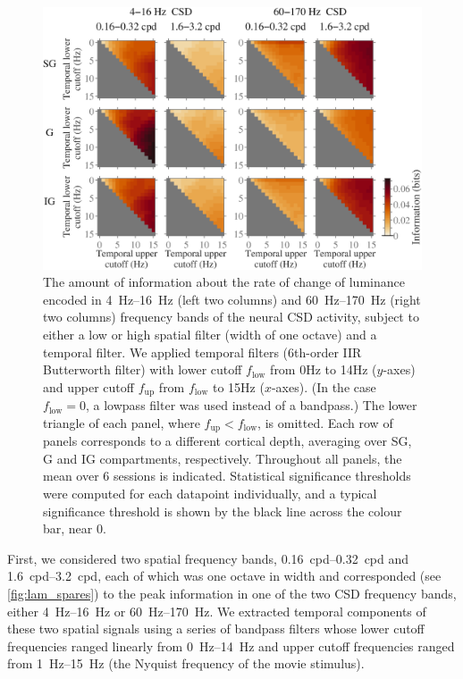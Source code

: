 \begin{figure}[htbp]
\centerline{
\includegraphics[scale=.4]{figs/tmf/tmf-v-tmf-sggig-avg-tmfres1b-2Band-2Crs.eps}
}
%
\caption{
The amount of information about the rate of change of luminance encoded in \SIrange{4}{16}{Hz} (left two columns) and \SIrange{60}{170}{Hz} (right two columns) frequency bands of the neural \ac{CSD} activity, subject to either a low or high spatial filter (width of one octave) and a temporal filter.
We applied temporal filters (6th-order \ac{IIR} Butterworth filter) with lower cutoff $f_\text{low}$ from \num{0}{Hz} to \num{14}{Hz} ($y$-axes) and upper cutoff $f_\text{up}$ from $f_\text{low}$ to \num{15}{Hz} ($x$-axes).
(In the case $f_\text{low} = 0$, a lowpass filter was used instead of a bandpass.)
The lower triangle of each panel, where $f_\text{up} < f_\text{low}$, is omitted.
Each row of panels corresponds to a different cortical depth, averaging over \ac{SG}, \ac{G} and \ac{IG} compartments, respectively.
Throughout all panels, the mean over \num{6} sessions is indicated.
Statistical significance thresholds were computed for each datapoint individually, and a typical significance threshold is shown by the black line across the colour bar, near $0$.
}
\label{fig:lam_tmf}
%
\end{figure}

First, we considered two spatial frequency bands, \SIrange{0.16}{0.32}{cpd} and \SIrange{1.6}{3.2}{cpd}, each of which was one octave in width and corresponded (see \autoref{fig:lam_spares}) to the peak information in one of the two \ac{CSD} frequency bands, either \SIrange{4}{16}{Hz} or \SIrange{60}{170}{Hz}.
We extracted temporal components of these two spatial signals using a series of bandpass filters whose lower cutoff frequencies ranged linearly from \SIrange{0}{14}{Hz} and upper cutoff frequencies ranged from \SIrange{1}{15}{Hz} (the Nyquist frequency of the movie stimulus).

